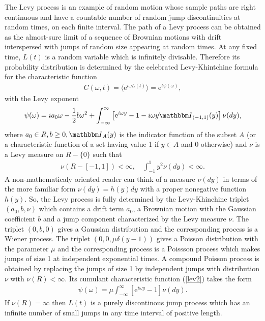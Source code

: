 \documentclass[authoryear,draft,1p,times]{elsarticle}
\renewcommand{\=}{\stackrel{\mathrm{d}}{=}}
\begin{document}
The Levy process  is an example of random motion whose sample paths are right continuous and have a countable number of random jump discontinuities at random times, on each finite interval. 
The path of a Levy process can be obtained as the almost-sure limit of a sequence of Brownian motions with drift interspersed with jumps of random size appearing at random times.  
At any fixed time, $L(t)$ is a random variable which is infinitely divisable. 
Therefore  its probability distribution is determined by the celebrated Levy-Khintchine formula 
for the characteristic function 
%
\begin{eqnarray}  \label{lev1}
C(\omega, t) = \langle \mbox{e}^{i\omega L(t)} \rangle = \mbox{e}^{t \psi(\omega)}, 
\end{eqnarray}
%
with the Levy exponent 
%
\begin{eqnarray}  \label{lev2}
 \psi(\omega) = ia_0 \omega -\frac{1}{2} b \omega^2  + 
\int_{-\infty}^{\infty} \left[\mbox{e}^{i\omega y} - 1 - i\omega y {\mathbbm I}_{(-1,1)}(y) 
\right]  \nu (dy), 
\end{eqnarray}
%
where $a_0\in  R, b \ge 0, {\mathbbm I}_A(y)$ is the indicator function of the 
 subset $A$ (or a characteristic function of a set having value 1 if $y \in A$  and 0 otherwise) and  $\nu$ is a Levy measure on  $R-\{0\}$ such that 
%
\begin{eqnarray}  \label{lev3}
\nu (R-[-1, 1]) < \infty, \quad \int_{-1}^1 y^2 \nu(dy) < \infty .
\end{eqnarray}
A non-mathematicaly oriented reader can think of a measure $\nu(dy)$ in terms of the more familiar form   $\nu(dy) = h(y) dy$ with a proper nonegative function  $h(y)$. 
So, the Levy process is fully determined by the Levy-Khinchine triplet $(a_0, b, \nu)$ which 
contains a drift term  $a_0$, a Brownian motion with the Gaussian coefficient $b$ and a jump component 
characterized by the Levy measure $\nu$. 
The triplet $(0, b, 0)$  gives a Gaussian distribution and the corresponding process is 
a Wiener process.  The triplet $(0, 0, \mu \delta(y-1))$  gives a Poisson  distribution 
with the parameter $\mu$ and the corresponding process is a Poissson process 
which makes jumps of size 1 at independent exponential times.  
A compound Poisson process is obtained  by replacing the jumps of size 1 by independent  
jumps with  distribution $\nu$ with $\nu(R) <\infty$.   Its  cumulant  characteristic function (\ref{lev2}) takes the form  
%
\begin{eqnarray}  \label{lev4}
 \psi(\omega) = \mu 
\int_{-\infty}^{\infty} \left[\mbox{e}^{i\omega y} - 1 \right]   \nu (dy). 
\end{eqnarray}
%
If $\nu(R) = \infty$ then $L(t)$ is a purely discontinous jump process which has an infinite number of small jumps in any time interval of positive length.  
\end{document}
